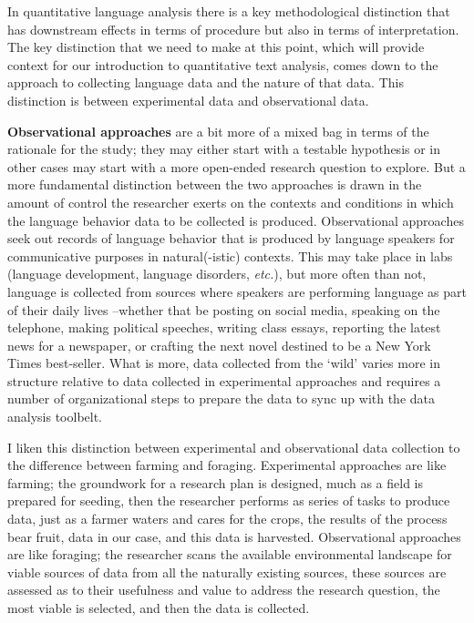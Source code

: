 \documentclass[
  letterpaper,
]{latex/krantz}
\theoremstyle{definition}
\theoremstyle{remark}
\begin{document}
In quantitative language analysis there is a key methodological
distinction that has downstream effects in terms of procedure but also
in terms of interpretation. The key distinction that we need to make at
this point, which will provide context for our introduction to
quantitative text analysis, comes down to the approach to collecting
language data and the nature of that data. This distinction is between
experimental data and observational data.

\textbf{Observational approaches} are a bit
more of a mixed bag in terms of the rationale for the study; they may
either start with a testable hypothesis or in other cases may start with
a more open-ended research question to explore. But a more fundamental
distinction between the two approaches is drawn in the amount of control
the researcher exerts on the contexts and conditions in which the
language behavior data to be collected is produced. Observational
approaches seek out records of language behavior that is produced by
language speakers for communicative purposes in natural(-istic)
contexts. This may take place in labs (language development, language
disorders, \emph{etc.}), but more often than not, language is collected
from sources where speakers are performing language as part of their
daily lives --whether that be posting on social media, speaking on the
telephone, making political speeches, writing class essays, reporting
the latest news for a newspaper, or crafting the next novel destined to
be a New York Times best-seller. What is more, data collected from the
`wild' varies more in structure relative to data collected in
experimental approaches and requires a number of organizational steps to
prepare the data to sync up with the data analysis toolbelt.

I liken this distinction between experimental and observational data
collection to the difference between farming and foraging. Experimental
approaches are like farming; the groundwork for a research plan is
designed, much as a field is prepared for seeding, then the researcher
performs as series of tasks to produce data, just as a farmer waters and
cares for the crops, the results of the process bear fruit, data in our
case, and this data is harvested. Observational approaches are like
foraging; the researcher scans the available environmental landscape for
viable sources of data from all the naturally existing sources, these
sources are assessed as to their usefulness and value to address the
research question, the most viable is selected, and then the data is
collected.
\end{document}
